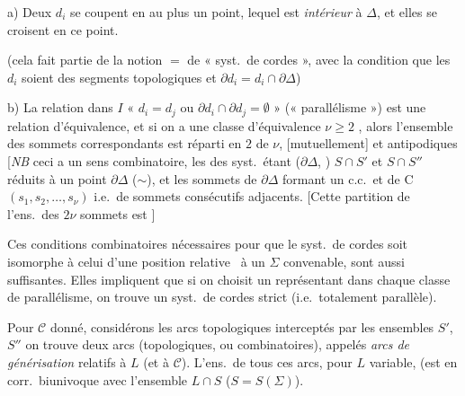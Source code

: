 \documentclass[11pt,a4paper]{article}
\begin{document}
a) Deux $d_i$ se coupent en au plus un point, lequel est \emph{intérieur} à $\Delta$, et elles se croisent en ce point.

(cela fait partie de la notion $=$ de « syst.\ de cordes », avec la condition que les $d_i$ soient des segments topologiques et $\partial d_i = d_i \cap \partial\Delta$)

b) La relation dans $I$ « $d_i = d_j$ ou \struck{\ill{}} $\partial d_i \cap \partial d_j = \emptyset$ » (« parallélisme ») est une relation d'équivalence, et \struck{\ill{}} si on a une classe d'équivalence \struck{\ill{}} \add{\ill{}} $\nu \geq 2$ \struck{\ill{} \ill{} \ill{}}, alors l'ensemble des  sommets correspondants est réparti en $2$   de $\nu$, [mutuellement] et antipodiques [\emph{NB} ceci a un sens  combinatoire, les  des syst.\ étant   ($\partial\Delta$, \ill{}) \ill{} \ill{} \ill{} $S \cap S'$ et $S \cap S''$ réduits à un point \ill{} $\partial\Delta$ ($\sim$), et les sommets de $\partial\Delta$  formant un c.c.\ et de C  $(s_1, s_2, \ldots, s_\nu)$ i.e.\ de sommets consécutifs adjacents. [Cette partition de l'ens.\ des $2\nu$ sommets est ]

Ces conditions combinatoires nécessaires pour que le syst.\ de cordes soit isomorphe à celui d'une position relative \ à un $\Sigma$ convenable, sont aussi suffisantes. Elles impliquent que si on choisit un représentant dans chaque classe de parallélisme, on trouve un syst.\ de cordes strict (i.e.\ totalement parallèle).

Pour $\mathcal{C}$ donné, considérons les arcs topologiques interceptés par les ensembles $S'$, $S''$ on trouve deux arcs (topologiques, ou combinatoires), appelés \emph{arcs de générisation} relatifs à $L$ (et à $\mathcal{C}$). L'ens.\ de tous ces arcs, pour $L$ variable,  (est en corr.\ biunivoque avec l'ensemble $L \cap S$ ($S = S(\Sigma)$).
\end{document}
